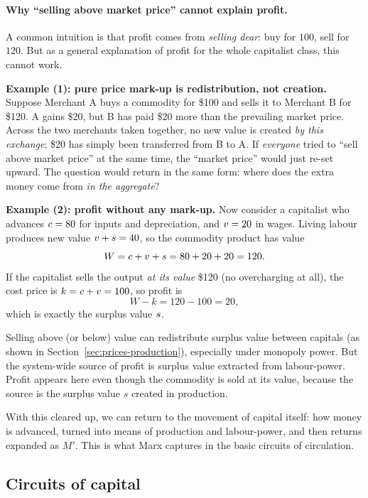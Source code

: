 \paragraph{Why ``selling above market price'' cannot explain profit.}
A common intuition is that profit comes from \emph{selling dear}: buy for $100$, sell for $120$.
But as a general explanation of profit for the whole capitalist class, this cannot work.

\textbf{Example (1): pure price mark-up is redistribution, not creation.}
Suppose Merchant A buys a commodity for \$100 and sells it to Merchant B for \$120.
A gains \$20, but B has paid \$20 more than the prevailing market price. Across the two
merchants taken together, no new value is created \emph{by this exchange}; \$20 has simply been
transferred from B to A. If \emph{everyone} tried to ``sell above market price'' at the same time,
the ``market price'' would just re-set upward. The question would return in the same form:
where does the extra money come from \emph{in the aggregate}?

\medskip

\textbf{Example (2): profit without any mark-up.}
Now consider a capitalist who advances $c=80$ for inputs and depreciation, and $v=20$ in wages.
Living labour produces new value $v+s = 40$, so the commodity product has value
\[
  W = c + v + s = 80 + 20 + 20 = 120.
\]
If the capitalist sells the output \emph{at its value} \$120 (no overcharging at all), the cost price is
$k=c+v=100$, so profit is
\[
  W-k = 120-100=20,
\]
which is exactly the surplus value $s$.

\medskip

\noindent
Selling above (or below) value can redistribute surplus value between capitals (as shown in
Section~\ref{sec:prices-production}), especially under monopoly power. But the system-wide source of
profit is surplus value extracted from labour-power. Profit appears here even though the commodity is
sold at its value, because the source is the surplus value $s$ created in production.

\medskip
With this cleared up, we can return to the movement of capital itself: how money is advanced, turned into means of production and labour-power, and then returns expanded as $M'$. This is what Marx captures in the basic circuits of circulation.
\medskip


\subsection{Circuits of capital}
\label{subsec:circuits}


